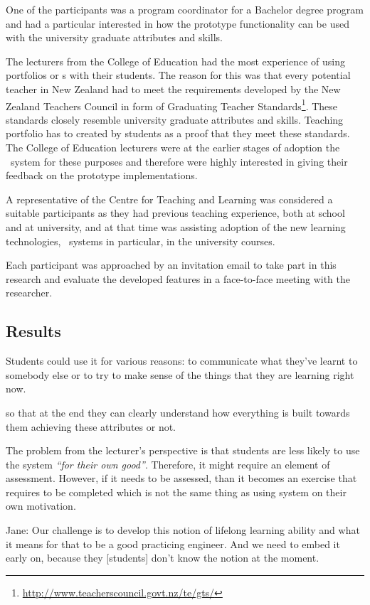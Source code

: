 One of the participants was a program coordinator for a Bachelor degree program
and had a particular interested in how the prototype functionality can be used
with the university graduate attributes and \LLLs skills.

The lecturers from the College of Education had the most experience of using
portfolios or \ep s with their students. The reason for this was that every
potential teacher in New Zealand had to meet the requirements developed by the
New Zealand Teachers Council in form of Graduating Teacher
Standards\footnote{\url{http://www.teacherscouncil.govt.nz/te/gts/}}. These
standards closely resemble university graduate attributes and \LLLs skills.
Teaching portfolio has to created by students as a proof that they meet these
standards. The College of Education lecturers were at the earlier stages of
adoption the \ep~system for these purposes and therefore were highly interested
in giving their feedback on the prototype implementations.

A representative of the Centre for Teaching and Learning was considered a
suitable participants as they had previous teaching experience, both at school
and at university, and at that time was assisting adoption of the new learning
technologies, \ep~systems in particular, in the university courses.

Each participant was approached by an invitation email to take part in this
research and evaluate the developed features in a face-to-face meeting with the
researcher.

\subsection{Results}

Students could use it for various reasons: to communicate what they've learnt
to somebody else or to try to make sense of the things that they are learning
right now.

so that at the end they can clearly understand how everything is built towards
them achieving these attributes or not.

The problem from the lecturer's perspective is that students are less likely to
use the system \textit{``for their own good''}. Therefore, it might require an
element of assessment. However, if it needs to be assessed, than it becomes an
exercise that requires to be completed which is not the same thing as using
system on their own motivation.

Jane: Our challenge is to develop this notion of lifelong learning ability and
what it means for that to be a good practicing engineer. And we need to embed it
early on, because they [students] don't know the notion at the moment.

